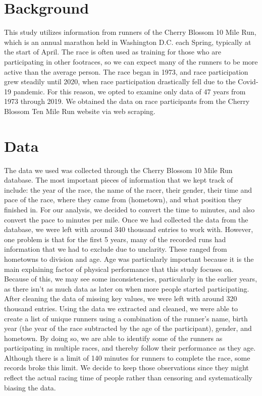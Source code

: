 \documentclass[12pt]{article}
\begin{document}
\section*{Background}

This study utilizes information from runners of the Cherry Blossom 10 Mile Run, which is an annual marathon held in Washington D.C. each Spring, typically at the start of April. The race is often used as training for those who are participating in other footraces, so we can expect many of the runners to be more active than the average person. The race began in 1973, and race participation grew steadily until 2020, when race participation drastically fell due to the Covid-19 pandemic. For this reason, we opted to examine only data of 47 years from 1973 through 2019. We obtained the data on race participants from the Cherry Blossom Ten Mile Run website via web scraping.


\section*{Data}

The data we used was collected through the Cherry Blossom 10 Mile Run database. The most important pieces of information that we kept track of include: the year of the race, the name of the racer, their gender, their time and pace of the race, where they came from (hometown), and what position they finished in. For our analysis, we decided to convert the time to minutes, and also convert the pace to minutes per mile. Once we had collected the data from the database, we were left with around 340 thousand entries to work with. However, one problem is that for the first 5 years, many of the recorded runs had information that we had to exclude due to unclarity. These ranged from hometowns to division and age. Age was particularly important because it is the main explaining factor of physical performance that this study focuses on. Because of this, we may see some inconsistencies, particularly in the earlier years, as there isn’t as much data as later on when more people started participating. After cleaning the data of missing key values, we were left with around 320 thousand entries. Using the data we extracted and cleaned, we were able to create a list of unique runners using a combination of the runner’s name, birth year (the year of the race subtracted by the age of the participant), gender, and hometown. By doing so, we are able to identify some of the runners as participating in multiple races, and thereby follow their performance as they age. Although there is a limit of 140 minutes for runners to complete the race, some records broke this limit. We decide to keep those observations since they might reflect the actual racing time of people rather than censoring and systematically biasing the data.
\end{document}

